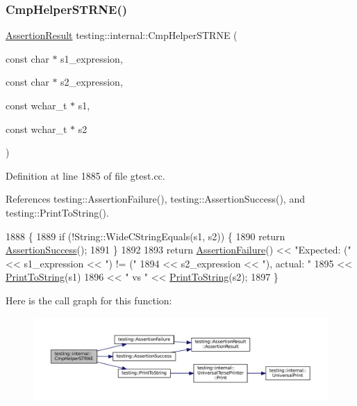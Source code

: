 \subsubsection{\texorpdfstring{Cmp\+Helper\+S\+T\+R\+N\+E()}{CmpHelperSTRNE()}\hspace{0.1cm}{\footnotesize\ttfamily [2/2]}}
{\footnotesize\ttfamily \hyperlink{classtesting_1_1AssertionResult}{Assertion\+Result} testing\+::internal\+::\+Cmp\+Helper\+S\+T\+R\+NE (\begin{DoxyParamCaption}\item[{const char $\ast$}]{s1\+\_\+expression,  }\item[{const char $\ast$}]{s2\+\_\+expression,  }\item[{const wchar\+\_\+t $\ast$}]{s1,  }\item[{const wchar\+\_\+t $\ast$}]{s2 }\end{DoxyParamCaption})}



Definition at line 1885 of file gtest.\+cc.



References testing\+::\+Assertion\+Failure(), testing\+::\+Assertion\+Success(), and testing\+::\+Print\+To\+String().


\begin{DoxyCode}
1888                                                   \{
1889   \textcolor{keywordflow}{if} (!String::WideCStringEquals(s1, s2)) \{
1890     \textcolor{keywordflow}{return} \hyperlink{namespacetesting_ac1d0baedb17286c5c6c87bd1a45da8ac}{AssertionSuccess}();
1891   \}
1892 
1893   \textcolor{keywordflow}{return} \hyperlink{namespacetesting_a75cb789614cb1c28c34627a4a3c053df}{AssertionFailure}() << \textcolor{stringliteral}{"Expected: ("} << s1\_expression << \textcolor{stringliteral}{") != ("}
1894                             << s2\_expression << \textcolor{stringliteral}{"), actual: "}
1895                             << \hyperlink{namespacetesting_aa5717bb1144edd1d262d310ba70c82ed}{PrintToString}(s1)
1896                             << \textcolor{stringliteral}{" vs "} << \hyperlink{namespacetesting_aa5717bb1144edd1d262d310ba70c82ed}{PrintToString}(s2);
1897 \}
\end{DoxyCode}
Here is the call graph for this function\+:
\nopagebreak
\begin{figure}[H]
\begin{center}
\leavevmode
\includegraphics[width=350pt]{namespacetesting_1_1internal_a415a953647bbc9469f062dc966061efb_cgraph}
\end{center}
\end{figure}
\mbox{\label{namespacetesting_1_1internal_a0c0f9558efb9abb965851c4738cdc725}} 
